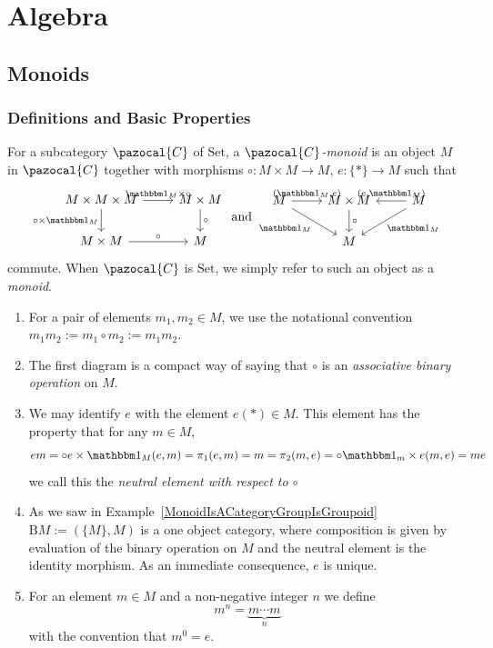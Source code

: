 \section{Algebra}
\subsection{Monoids}

\subsubsection{Definitions and Basic Properties}
\begin{definition}
    For a subcategory $\pazocal{C}$ of $\mathrm{Set}$, a \emph{$\pazocal{C}$-monoid} is an object $M$ in $\pazocal{C}$ together with morphisms $\circ : M\times M \rightarrow M$, $e : \{\ast\} \rightarrow M$ such that 
    $$
    \begin{tikzcd}
        M\times M \times M \arrow[r,"\fone_M\times \circ"] \arrow[d,"\circ \times \fone_M",swap] & M\times M \arrow[d,"\circ"]\\
        M\times M \arrow[r,"\circ"] & M
    \end{tikzcd}
    \text{ and }
    \begin{tikzcd}
        M \arrow[r, "(\fone_M{,} e)"] \arrow[rd,"\fone_M",swap] & M \times  M \arrow[d,"\circ"] &  M\arrow[l,"(e{,}\fone_M)",swap] \arrow[ld, "\fone_M"]\\
        & M
    \end{tikzcd}
    $$ 
    commute. When $\pazocal{C}$ is $\mathrm{Set}$, we simply refer to such an object as a \emph{monoid}.
\end{definition}
\begin{remark}
    \begin{enumerate}
        \item For a pair of elements $m_1,m_2\in M$, we use the notational convention $m_1m_2 := m_1\circ m_2:= m_1m_2$. 
        \item The first diagram is a compact way of saying that $\circ$ is an \emph{associative binary operation} on $M$. 
        \item We may identify $e$ with the element $e(\ast)\in M$. This element has the property that for any $m \in M$,
        $$
            e m = \circ e\times \fone_M(e,m) = \pi_1(e,m)= m = \pi_2(m,e)= \circ \fone_m\times e(m,e) = me  
        $$
        we call this the \emph{neutral element with respect to $\circ$}   
        \item As we saw in Example~\ref{MonoidIsACategoryGroupIsGroupoid} $\mathrm{B}M := (\{M\}, M)$ is a one object category, where composition is given by evaluation of the binary operation on $M$ and the neutral element is the identity morphism. As an immediate consequence, $e$ is unique.
        \item For an element $m\in M$ and a non-negative integer $n$ we define 
        $$
            m^n = \underbrace{m\cdots m}_{n}
        $$
        with the convention that $m^0 = e$.
    \end{enumerate}
\end{remark}
